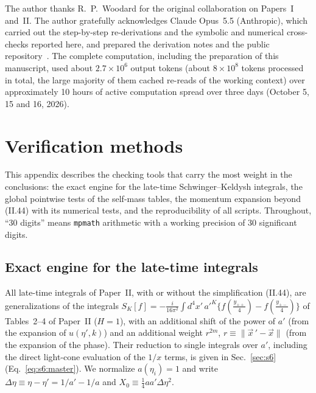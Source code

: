 \documentclass[aps,prd,onecolumn,10pt,nofootinbib,floatfix]{revtex4-2}
\newcommand{\eqII}[1]{(II.#1)}
\newcommand{\TOKOUT}{$2.7\times10^{6}$}
\newcommand{\TOKTOT}{about $8\times10^{8}$}
\newcommand{\HOURS}{10}
\newcommand{\NDAYS}{three}
\begin{document}
\begin{acknowledgments}
The author thanks R.~P.~Woodard for the original collaboration on Papers~I and~II\@. The author gratefully acknowledges Claude
Opus~5.5 (Anthropic), which carried out the step-by-step re-derivations and the symbolic and numerical cross-checks reported here,
and prepared the derivation notes and the public repository~\cite{ref:repo}. The complete computation, including the preparation of
this manuscript, used about \TOKOUT{} output tokens (\TOKTOT{} tokens processed in total, the large majority of them cached re-reads
of the working context) over approximately \HOURS{} hours of active computation spread over \NDAYS{} days (October 5, 15 and 16, 2026).
\end{acknowledgments}

\appendix

\section{Verification methods}
\label{app:s0s1s7s8:verification}

This appendix describes the checking tools that carry the most weight in the conclusions: the exact engine for the late-time
Schwinger--Keldysh integrals, the global pointwise tests of the self-mass tables, the momentum expansion beyond \eqII{44} with its
numerical tests, and the reproducibility of all scripts. Throughout, ``30 digits'' means \texttt{mpmath} arithmetic with a working
precision of 30 significant digits.

\subsection{Exact engine for the late-time integrals}
\label{app:s0s1s7s8:engine}

All late-time integrals of Paper~II, with or without the simplification \eqII{44}, are generalizations of the integrals
$S_K[f]=-\frac{i}{16\pi^2}\int d^4x'\,a'^K\{f(\frac{y_{++}}{4})-f(\frac{y_{+-}}{4})\}$ of Tables~2--4 of Paper~II ($H=1$), with an
additional shift of the power of $a'$ (from the expansion of $u(\eta',k)$) and an additional weight $r^{2m}$, $r\equiv\|\vec x\,'-\vec
x\|$ (from the expansion of the phase). Their reduction to single integrals over $a'$, including the direct light-cone evaluation of the
$1/x$ terms, is given in Sec.~\ref{sec:s6} (Eq.~\eqref{eq:s6:master}). We normalize $a(\eta_i)=1$ and write
$\Delta\eta\equiv\eta-\eta'=1/a'-1/a$ and $X_0\equiv\tfrac14aa'\Delta\eta^2$.
\end{document}
